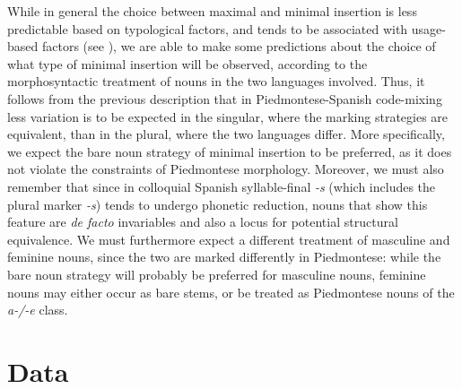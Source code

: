 \documentclass[output=paper]{langscibook}
\begin{document}
While in general the choice between maximal and minimal insertion is less predictable based on typological factors, and tends to be associated with usage-based factors (see \citealt{Hakimov2021}), we are able to make some predictions about the choice of what type of minimal insertion will be observed, according to the morphosyntactic treatment of nouns in the two languages involved. Thus, it follows from the previous description that in Piedmontese-Spanish code-mixing less variation is to be expected in the singular, where the marking strategies are equivalent, than in the plural, where the two languages differ. More specifically, we expect the bare noun strategy of minimal insertion to be preferred, as it does not violate the constraints of Piedmontese morphology. Moreover, we must also remember that since in colloquial Spanish syllable-final \textit{{}-s} (which includes the plural marker \textit{{}-s}) tends to undergo phonetic reduction, nouns that show this feature are \textit{de facto} invariables and also a locus for potential structural equivalence. We must furthermore expect a different treatment of masculine and feminine nouns, since the two are marked differently in Piedmontese: while the bare noun strategy will probably be preferred for masculine nouns, feminine nouns may either occur as bare stems, or be treated as Piedmontese nouns of the \textit{a-/-e} class. 

\section{Data}\label{sec:goria:5}
\end{document}
